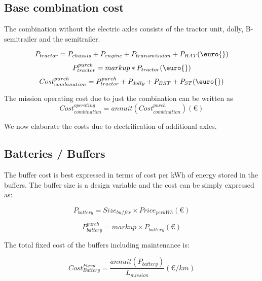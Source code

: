 \documentclass[ExampleMasters.tex]{subfiles}
\begin{document}
		\subsection{Base combination cost}

			The combination without the electric axles consists of the tractor unit, dolly, B-semitrailer and the semitrailer. 

			\begin{equation}
				P_{tractor} = P_{chassis}+P_{engine}+P_{transmission}+P_{RAT}  (\euro{})\\
			\end{equation}
			\begin{equation}
				P_{tractor}^{purch}= markup*P_{tractor} (\euro{})\\
			\end{equation}
			\begin{equation}
				Cost_{combination}^{purch} = P_{tractor}^{purch}+P_{dolly}+P_{BST}+P_{ST} (\euro{})\\
			\end{equation}

			The mission operating cost due to just the combination can be written as 
			\begin{equation}
				Cost_{combination}^{operating} = annuit(Cost_{combination}^{purch}) (\euro{})
			\end{equation}

			We now elaborate the costs due to electrification of additional axles.

		\subsection{Batteries / Buffers}

			The buffer cost is best expressed in terms of cost per kWh of energy stored in the buffers. The buffer size is a design variable and the cost can be simply expressed as:

			\begin{equation}
				P_{battery}= Size_{buffer} \times Price_{perkWh} (\euro{})
			\end{equation}

			\begin{equation} 
				P^{purch}_{battery} = markup \times P_{battery} (\euro{})
			\end{equation}

			The total fixed cost of the buffers including maintenance is:

			\begin{equation} \label{8}
				Cost_{Battery}^{Fixed} = \frac{annuit(P_{battery})}{L_{mission}} (\euro{}/km)
			\end{equation}
\end{document}
